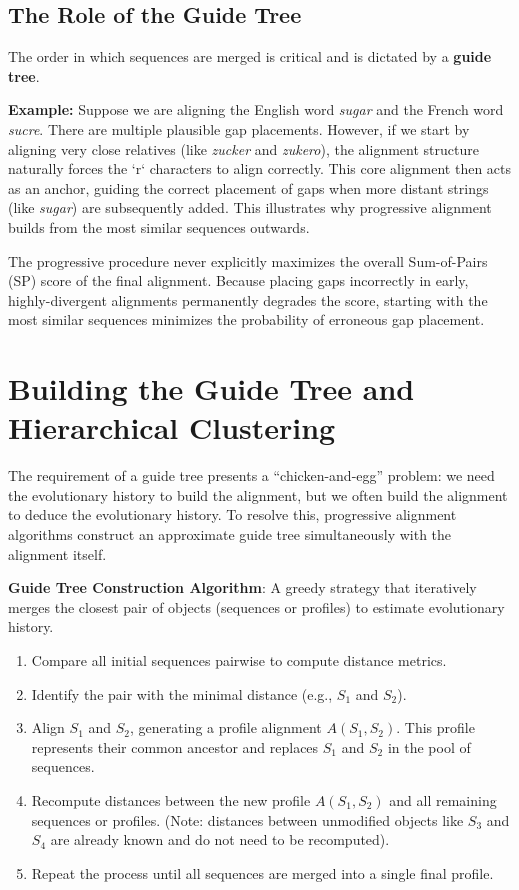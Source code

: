 \subsection{The Role of the Guide Tree}
The order in which sequences are merged is critical and is dictated by a \textbf{guide tree}.

\textbf{Example:}
Suppose we are aligning the English word \textit{sugar} and the French word \textit{sucre}.
There are multiple plausible gap placements. However, if we start by aligning very close relatives (like \textit{zucker} and \textit{zukero}), the alignment structure naturally forces the `r` characters to align correctly. This core alignment then acts as an anchor, guiding the correct placement of gaps when more distant strings (like \textit{sugar}) are subsequently added. This illustrates why progressive alignment builds from the most similar sequences outwards.

\sta The progressive procedure never explicitly maximizes the overall Sum-of-Pairs (SP) score of the final alignment. Because placing gaps incorrectly in early, highly-divergent alignments permanently degrades the score, starting with the most similar sequences minimizes the probability of erroneous gap placement.

\section{Building the Guide Tree and Hierarchical Clustering}

The requirement of a guide tree presents a ``chicken-and-egg'' problem: we need the evolutionary history to build the alignment, but we often build the alignment to deduce the evolutionary history. To resolve this, progressive alignment algorithms construct an approximate guide tree simultaneously with the alignment itself.

\begin{important}
  \textbf{Guide Tree Construction Algorithm}: 
  A greedy strategy that iteratively merges the closest pair of objects (sequences or profiles) to estimate evolutionary history.
\end{important}

\begin{enumerate}
  \item Compare all initial sequences pairwise to compute distance metrics.
  \item Identify the pair with the minimal distance (e.g., $S_1$ and $S_2$).
  \item Align $S_1$ and $S_2$, generating a profile alignment $A(S_1, S_2)$. This profile represents their common ancestor and replaces $S_1$ and $S_2$ in the pool of sequences.
  \item Recompute distances between the new profile $A(S_1, S_2)$ and all remaining sequences or profiles. (Note: distances between unmodified objects like $S_3$ and $S_4$ are already known and do not need to be recomputed).
  \item Repeat the process until all sequences are merged into a single final profile.
\end{enumerate}

